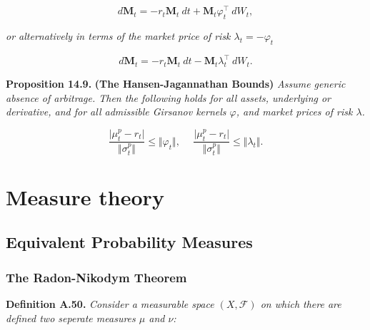 \documentclass[
]{article}
\begin{document}
\[
d\mathbf{M}_t=-r_t\mathbf{M}_t\ dt+\mathbf{M}_t\varphi_t^\top\ dW_t,\tag{14.39}
\]

\emph{or alternatively in terms of the market price of risk
\(\lambda_t=-\varphi_t\)}

\[
d\mathbf{M}_t=-r_t\mathbf{M}_t\ dt-\mathbf{M}_t\lambda_t^\top\ dW_t.\tag{14.40}
\]

\textbf{Proposition 14.9.} \textbf{(The Hansen-Jagannathan Bounds)}
\emph{Assume generic absence of arbitrage. Then the following holds for
all assets, underlying or derivative, and for all admissible Girsanov
kernels \(\varphi\), and market prices of risk \(\lambda\).}

\[
\frac{\vert \mu_t^p - r_t\vert}{\Vert \sigma_t ^p\Vert}\le \Vert \varphi_t\Vert,\hspace{15pt} \frac{\vert \mu_t^p - r_t\vert}{\Vert \sigma_t ^p\Vert}\le \Vert \lambda_t\Vert.\tag{14.42}
\]

\hypertarget{measure-theory}{%
\section{Measure theory}\label{measure-theory}}

\hypertarget{equivalent-probability-measures}{%
\subsection{Equivalent Probability
Measures}\label{equivalent-probability-measures}}

\hypertarget{the-radon-nikodym-theorem}{%
\subsubsection{The Radon-Nikodym
Theorem}\label{the-radon-nikodym-theorem}}

\textbf{Definition A.50.} \emph{Consider a measurable space
\((X,\mathcal{F})\) on which there are defined two seperate measures
\(\mu\) and \(\nu\):}
\end{document}
